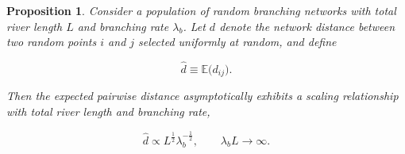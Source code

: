 \documentclass[11pt, class=article, crop=false]{standalone}
\newtheorem{proposition}{Proposition}[subsection]
\theoremstyle{definition}
\begin{document}
\begin{proposition}
\label{proposition-mu-d}
Consider a population of random branching networks with total river length $L$ and branching rate $\lambda_b$.
Let $d$ denote the network distance between two random points $i$ and $j$ selected uniformly at random, and define

\begin{equation}
    \hat{d} \equiv \mathbb{E}\bigl(d_{ij}\bigr).
\end{equation}

Then the expected pairwise distance asymptotically exhibits a scaling relationship with total river length and branching rate,

\begin{equation}
    \hat{d}
    \propto
    L^{\frac{1}{2}}\lambda_b^{-\frac{1}{2}},
    \qquad
    \lambda_b L \to \infty.
\end{equation}

\end{proposition}
\end{document}
